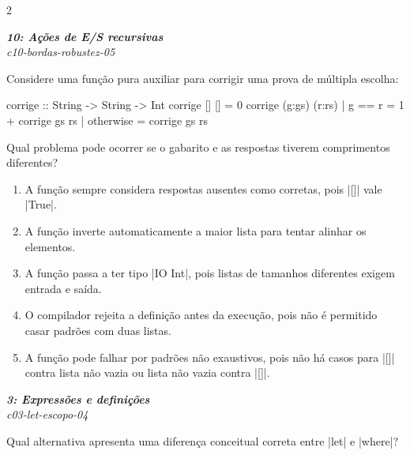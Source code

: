 \documentclass[a4paper,10pt,brazil]{article}
\begin{document}
\begin{multicols}{2}
\begin{flushright}
  \footnotesize
  \textit{\textbf{10: Ações de E/S recursivas}}\\
  \textit{c10-bordas-robustez-05}\\

\end{flushright}
Considere uma função pura auxiliar para corrigir uma prova de múltipla escolha:

\begin{haskellcode}
corrige :: String -> String -> Int
corrige [] [] = 0
corrige (g:gs) (r:rs)
  | g == r    = 1 + corrige gs rs
  | otherwise = corrige gs rs
\end{haskellcode}

Qual problema pode ocorrer se o gabarito e as respostas tiverem comprimentos diferentes?

\begin{enumerate}
  \item A função sempre considera respostas ausentes como corretas, pois \haskellinline|[]| vale \haskellinline|True|.

  \item A função inverte automaticamente a maior lista para tentar alinhar os elementos.

  \item A função passa a ter tipo \haskellinline|IO Int|, pois listas de tamanhos diferentes exigem entrada e saída.

  \item O compilador rejeita a definição antes da execução, pois não é permitido casar padrões com duas listas.

  \item A função pode falhar por padrões não exaustivos, pois não há casos para \haskellinline|[]| contra lista não vazia ou lista não vazia contra \haskellinline|[]|.


\end{enumerate}

\begin{flushright}
  \footnotesize
  \textit{\textbf{3: Expressões e definições}}\\
  \textit{c03-let-escopo-04}\\

\end{flushright}
Qual alternativa apresenta uma diferença conceitual correta entre \haskellinline|let| e \haskellinline|where|?


\end{multicols}
\end{document}

